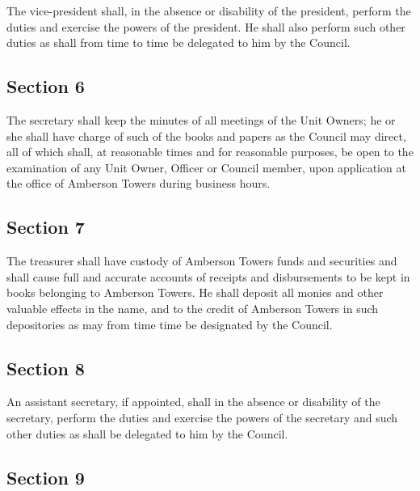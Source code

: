 \documentclass[
]{book}
\begin{document}
The vice-president shall, in the absence or disability of the president, perform the duties and exercise the powers of the president. He shall also perform such other duties as shall from time to time be delegated to him by the Council.

\hypertarget{section-6-2}{%
\subsection*{Section 6}\label{section-6-2}}

The secretary shall keep the minutes of all meetings of the Unit Owners; he or she shall have charge of such of the books and papers as the Council may direct, all of which shall, at reasonable times and for reasonable purposes, be open to the examination of any Unit Owner, Officer or Council member, upon application at the office of Amberson Towers during business hours.

\hypertarget{section-7-2}{%
\subsection*{Section 7}\label{section-7-2}}

The treasurer shall have custody of Amberson Towers funds and securities and shall cause full and accurate accounts of receipts and disbursements to be kept in books belonging to Amberson Towers. He shall deposit all monies and other valuable effects in the name, and to the credit of Amberson Towers in such depositories as may from time time be designated by the Council.

\hypertarget{section-8-2}{%
\subsection*{Section 8}\label{section-8-2}}

An assistant secretary, if appointed, shall in the absence or disability of the secretary, perform the duties and exercise the powers of the secretary and such other duties as shall be delegated to him by the Council.

\hypertarget{section-9-2}{%
\subsection*{Section 9}\label{section-9-2}}
\end{document}

